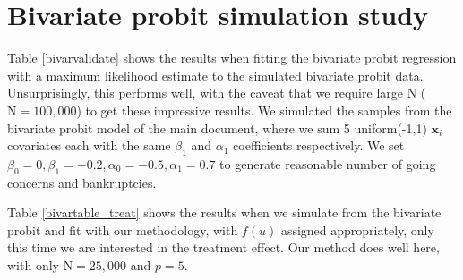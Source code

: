 \documentclass[aoas,preprint, 11pt, dvipsnames, table, x11name]{imsart}
\newcommand{\N}{\mbox{N}}
\renewcommand{\bm}[1]{\mathbf{#1}}
\theoremstyle{remark}
\begin{document}
	\section{Bivariate probit simulation study}\label{bivar_append}
	Table \ref{bivarvalidate} shows the results when fitting the bivariate probit regression with a maximum likelihood estimate to the simulated bivariate probit data.  Unsurprisingly, this performs well, with the caveat that we require large $\N$ ($\N=100,000$) to get these impressive results.  We simulated the samples from the bivariate probit model of the main document, where we sum 5 uniform(-1,1) $\bm{x}_i$ covariates each with the same $\beta_1$ and $\alpha_1$ coefficients respectively.  We set $\beta_0=0, \beta_1=-0.2, \alpha_0=-0.5, \alpha_1=0.7$ to generate reasonable number of going concerns and bankruptcies.
	
	Table \ref{bivartable_treat} shows the results when we simulate from the bivariate probit and fit with our methodology, with $f(u)$ assigned appropriately, only this time we are interested in the treatment effect.  Our method does well here, with only $\N=25,000$ and $p=5$.  
	
\end{document}
